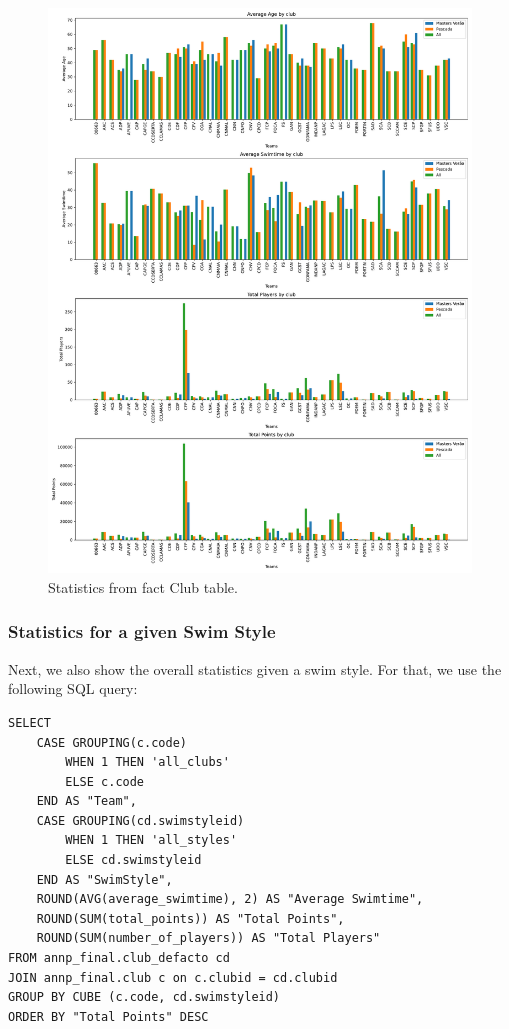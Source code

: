 \documentclass[a4paper, 11pt]{article}
\begin{document}
\begin{figure}[H]
    \centering
    \includegraphics[width=\textwidth]{img/club_fact1.pdf}
    \caption{Statistics from fact Club table.}
    \label{fig:clubs_fact}
\end{figure}

\subsubsection{Statistics for a given Swim Style}

Next, we also show the overall statistics given a swim style. For that, we use the following SQL query:

\begin{verbatim}
SELECT 
    CASE GROUPING(c.code)
        WHEN 1 THEN 'all_clubs'
        ELSE c.code
    END AS "Team",
    CASE GROUPING(cd.swimstyleid)
        WHEN 1 THEN 'all_styles'
        ELSE cd.swimstyleid
    END AS "SwimStyle",
    ROUND(AVG(average_swimtime), 2) AS "Average Swimtime",
    ROUND(SUM(total_points)) AS "Total Points",
    ROUND(SUM(number_of_players)) AS "Total Players"
FROM annp_final.club_defacto cd
JOIN annp_final.club c on c.clubid = cd.clubid
GROUP BY CUBE (c.code, cd.swimstyleid)
ORDER BY "Total Points" DESC
\end{verbatim}
\end{document}
